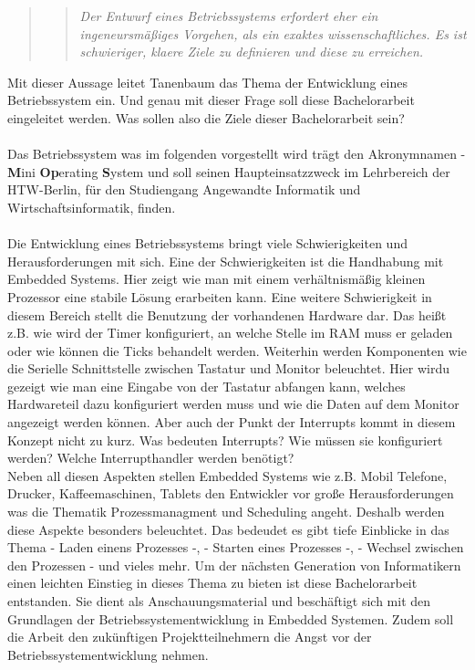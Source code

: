 \begin{quote}
\blockquote{\textit{Der Entwurf eines Betriebssystems erfordert eher ein ingeneursm\"a\ss iges Vorgehen, als ein exaktes wissenschaftliches. Es ist schwieriger, klaere Ziele zu definieren und diese zu erreichen.}}\parencite[911]{os}
\end{quote}
Mit dieser Aussage leitet Tanenbaum das Thema der Entwicklung eines Betriebssystem ein. Und genau mit dieser Frage soll diese Bachelorarbeit eingeleitet werden. Was sollen also die Ziele dieser Bachelorarbeit sein?\\\\
Das Betriebssystem was im folgenden vorgestellt wird tr\"agt den Akronymnamen \mops - \textbf{M}ini \textbf{Op}erating \textbf{S}ystem und soll seinen Haupteinsatzzweck im Lehrbereich der HTW-Berlin, f\"ur den Studiengang Angewandte Informatik und Wirtschaftsinformatik, finden.\\ \\
Die Entwicklung eines Betriebssystems bringt viele Schwierigkeiten und Herausforderungen mit sich. Eine der Schwierigkeiten ist die Handhabung mit Embedded Systems. Hier zeigt \mops wie man mit einem verh\"altnism\"a\ss ig kleinen Prozessor eine stabile L\"osung erarbeiten kann. Eine weitere Schwierigkeit in diesem Bereich stellt die Benutzung der vorhandenen Hardware dar. Das hei\ss t z.B. wie wird der Timer konfiguriert, an welche Stelle im RAM muss er geladen oder wie k\"onnen die Ticks behandelt werden. Weiterhin werden Komponenten wie die Serielle Schnittstelle zwischen Tastatur und Monitor beleuchtet. Hier wirdu gezeigt wie man eine Eingabe von der Tastatur abfangen kann, welches Hardwareteil dazu konfiguriert werden muss und wie die Daten auf dem Monitor angezeigt werden k\"onnen. Aber auch der Punkt der Interrupts kommt in diesem Konzept nicht zu kurz. Was bedeuten Interrupts? Wie m\"ussen sie konfiguriert werden? Welche Interrupthandler werden ben\"otigt?\\ Neben all diesen Aspekten stellen Embedded Systems wie z.B. Mobil Telefone, Drucker, Kaffeemaschinen, Tablets den Entwickler vor gro\ss e Herausforderungen was die Thematik Prozessmanagment und Scheduling angeht. Deshalb werden diese Aspekte besonders beleuchtet. Das bedeudet es gibt tiefe Einblicke in das Thema - Laden einens Prozesses -, - Starten eines Prozesses -, - Wechsel zwischen den Prozessen - und vieles mehr. Um der n\"achsten Generation von Informatikern einen leichten Einstieg in dieses Thema zu bieten ist diese Bachelorarbeit entstanden. Sie dient als Anschauungsmaterial und besch\"aftigt sich mit den Grundlagen der Betriebssystementwicklung in Embedded Systemen. Zudem soll die Arbeit den zuk\"unftigen Projektteilnehmern die Angst vor der Betriebssystementwicklung nehmen. \\
